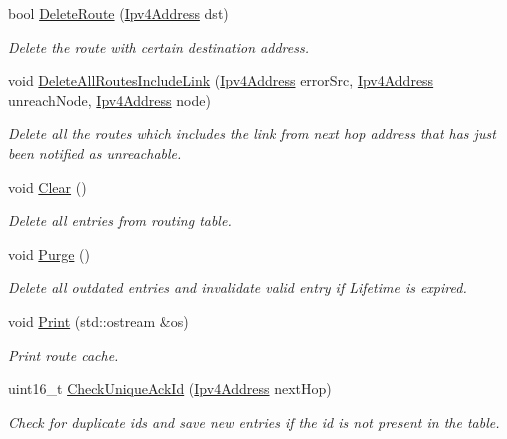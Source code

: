 \begin{DoxyCompactItemize}
bool \hyperlink{classns3_1_1dsr_1_1DsrRouteCache_aa3ad8c714828a57eeaae558320ee6523}{Delete\+Route} (\hyperlink{classns3_1_1Ipv4Address}{Ipv4\+Address} dst)
\begin{DoxyCompactList}\small\item\em Delete the route with certain destination address. \end{DoxyCompactList}\item 
void \hyperlink{classns3_1_1dsr_1_1DsrRouteCache_aee8f202a8c07cdfa27778f2f0be38e05}{Delete\+All\+Routes\+Include\+Link} (\hyperlink{classns3_1_1Ipv4Address}{Ipv4\+Address} error\+Src, \hyperlink{classns3_1_1Ipv4Address}{Ipv4\+Address} unreach\+Node, \hyperlink{classns3_1_1Ipv4Address}{Ipv4\+Address} node)
\begin{DoxyCompactList}\small\item\em Delete all the routes which includes the link from next hop address that has just been notified as unreachable. \end{DoxyCompactList}\item 
void \hyperlink{classns3_1_1dsr_1_1DsrRouteCache_a88c1ac52574db108dc113322d8045b8f}{Clear} ()
\begin{DoxyCompactList}\small\item\em Delete all entries from routing table. \end{DoxyCompactList}\item 
void \hyperlink{classns3_1_1dsr_1_1DsrRouteCache_a33ac58361cc0e1cbe1b561db26f5dc82}{Purge} ()
\begin{DoxyCompactList}\small\item\em Delete all outdated entries and invalidate valid entry if Lifetime is expired. \end{DoxyCompactList}\item 
void \hyperlink{classns3_1_1dsr_1_1DsrRouteCache_abd7f2670cf78e5d4d45e9499c3d351c4}{Print} (std\+::ostream \&os)
\begin{DoxyCompactList}\small\item\em Print route cache. \end{DoxyCompactList}\item 
uint16\+\_\+t \hyperlink{classns3_1_1dsr_1_1DsrRouteCache_a362f807c462851d08207689c252edbba}{Check\+Unique\+Ack\+Id} (\hyperlink{classns3_1_1Ipv4Address}{Ipv4\+Address} next\+Hop)
\begin{DoxyCompactList}\small\item\em Check for duplicate ids and save new entries if the id is not present in the table. \end{DoxyCompactList}\item 

\end{DoxyCompactItemize}
